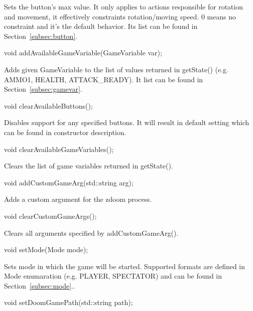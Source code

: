 Sets the button's max value. It only applies to actions responsible for rotation and movement, it effectively constraints rotation/moving speed.
0 means no constraint and it's the default behavior. Its list can be found in Section~\ref{subsec:button}.


\vspace{20pt}
\begin{clinee}
void addAvailableGameVariable(GameVariable var);
\end{clinee}

Adds given GameVariable to the list of values returned in getState() (e.g. AMMO1, HEALTH, ATTACK\_READY). It list can be found in Section~\ref{subsec:gamevar}.


\vspace{20pt}
\begin{clinee}
void clearAvailableButtons();
\end{clinee}

Disables support for any specified buttons. It will result in default setting which can be found in constructor description.


\vspace{20pt}
\begin{clinee}
void clearAvailableGameVariables();
\end{clinee}

Clears the list of game variables returned in getState().


\vspace{20pt}
\begin{clinee}
void addCustomGameArg(std::string arg);
\end{clinee}

Adds a custom argument for the zdoom process.


\vspace{20pt}
\begin{clinee}
void clearCustomGameArgs();
\end{clinee}

Clears all arguments specified by addCustomGameArg().


\vspace{20pt}
\begin{clinee}
void setMode(Mode mode);
\end{clinee}

Sets mode in which the game will be started. Supported formats are defined in Mode enumaration (e.g. PLAYER, SPECTATOR) and can be found in Section~\ref{subsec:mode}..


\vspace{20pt}
\begin{clinee}
void setDoomGamePath(std::string path);
\end{clinee}

